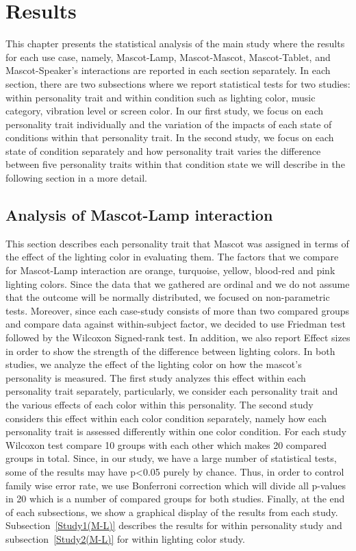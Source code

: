 \chapter{Results}
\label{Results}
This chapter presents the statistical analysis of the main study where the results for each use case, namely, Mascot-Lamp, Mascot-Mascot, Mascot-Tablet, and Mascot-Speaker’s interactions are reported in each section separately. In each section, there are two subsections where we report statistical tests for two studies: within personality trait and within condition such as lighting color, music category, vibration level or screen color. In our first study, we focus on each personality trait individually and the variation of the impacts of each state of conditions within that personality trait. In the second study, we focus on each state of condition separately and how personality trait varies the difference between five personality traits within that condition state we will describe in the following section in a more detail.

\section{Analysis of Mascot-Lamp interaction}
\label{M-L}
This section describes each personality trait that Mascot was assigned in terms of the effect of the lighting color in evaluating them. The factors that we compare for Mascot-Lamp interaction are orange, turquoise, yellow, blood-red and pink lighting colors. Since the data that we gathered are ordinal and we do not assume that the outcome will be normally distributed, we focused on non-parametric tests. Moreover, since each case-study consists of more than two compared groups and compare data against within-subject factor, we decided to use Friedman test followed by the Wilcoxon Signed-rank test. In addition, we also report Effect sizes in order to show the strength of the difference between lighting colors. In both studies, we analyze the effect of the lighting color on how the mascot’s personality is measured. The first study analyzes this effect within each personality trait separately, particularly, we consider each personality trait and the various effects of each color within this personality. The second study considers this effect within each color condition separately, namely how each personality trait is assessed differently within one color condition. For each study Wilcoxon test compare 10 groups with each other which makes 20 compared groups in total. Since, in our study, we have a large number of statistical tests, some of the results may have p<0.05 purely by chance. Thus, in order to control family wise error rate, we use Bonferroni correction which will divide all p-values in 20 which is a number of compared groups for both studies. Finally, at the end of each subsections, we show a graphical display of the results from each study. Subsection~\ref{Study1(M-L)} describes the results for within personality study and subsection~\ref{Study2(M-L)} for within lighting color study. 

